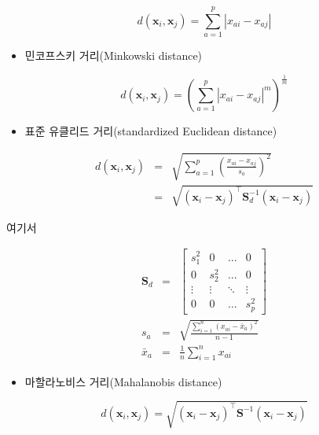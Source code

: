 \documentclass[]{book}
\providecommand{\tightlist}{%
  \setlength{\itemsep}{0pt}\setlength{\parskip}{0pt}}
\begin{document}
\begin{equation*}
d(\mathbf{x}_i, \mathbf{x}_j) = \sum_{a = 1}^{p} \left| x_{ai} - x_{aj} \right|
\end{equation*}

\begin{itemize}
\tightlist
\item
  민코프스키 거리(Minkowski distance)
\end{itemize}

\begin{equation*}
d(\mathbf{x}_i, \mathbf{x}_j) = \left( \sum_{a = 1}^{p} \left| x_{ai} - x_{aj} \right|^m \right)^\frac{1}{m}
\end{equation*}

\begin{itemize}
\tightlist
\item
  표준 유클리드 거리(standardized Euclidean distance)
\end{itemize}

\begin{eqnarray*}
d(\mathbf{x}_i, \mathbf{x}_j) &=& \sqrt{\sum_{a = 1}^{p} \left(\frac{x_{ai} - x_{aj}}{s_a}\right)^2}\\
&=& \sqrt{(\mathbf{x}_i - \mathbf{x}_j)^\top \mathbf{S}_d^{-1} (\mathbf{x}_i - \mathbf{x}_j)}
\end{eqnarray*}

여기서

\begin{eqnarray*}
\mathbf{S}_d &=& \begin{bmatrix}
s_1^2 & 0 & \dots & 0\\
0 & s_2^2 & \dots & 0\\
\vdots & \vdots & \ddots & \vdots\\
0 & 0 & \dots & s_p^2
\end{bmatrix}\\
s_a &=& \sqrt{\frac{\sum_{i = 1}^{n} \left(x_{ai} - \bar{x}_a \right)^2}{n - 1}}\\
\bar{x}_a &=& \frac{1}{n} \sum_{i = 1}^{n} x_{ai}
\end{eqnarray*}

\begin{itemize}
\tightlist
\item
  마할라노비스 거리(Mahalanobis distance)
\end{itemize}

\begin{equation*}
d(\mathbf{x}_i, \mathbf{x}_j) = \sqrt{(\mathbf{x}_i - \mathbf{x}_j)^\top \mathbf{S}^{-1} (\mathbf{x}_i - \mathbf{x}_j)}
\end{equation*}
\end{document}
